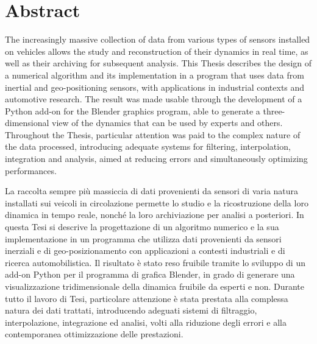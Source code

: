 %
%

\chapter*{Abstract}
\begin{SingleSpace}

The increasingly massive collection of data from various types of sensors installed on vehicles allows the study and reconstruction of their dynamics in real time, as well as their archiving for subsequent analysis.
This Thesis describes the design of a numerical algorithm and its implementation in a program that uses data from inertial and geo-positioning sensors, with applications in industrial contexts and automotive research. The result was made usable through the development of a Python add-on for the Blender graphics program, able to generate a three-dimensional view of the dynamics that can be used by experts and others.
Throughout the Thesis, particular attention was paid to the complex nature of the data processed, introducing adequate systems for filtering, interpolation, integration and analysis, aimed at reducing errors and simultaneously optimizing performances.

\vspace{20mm}

La raccolta sempre più massiccia di dati provenienti da sensori di varia natura installati sui veicoli in circolazione permette lo studio e la ricostruzione della loro dinamica in tempo reale, nonché la loro archiviazione per analisi a posteriori. 
In questa Tesi si descrive la progettazione di un algoritmo numerico e la sua implementazione in un programma che utilizza dati provenienti da sensori inerziali e di geo-posizionamento con applicazioni a contesti industriali e di ricerca automobilistica. Il risultato è stato reso fruibile tramite lo sviluppo di un add-on Python per il programma di grafica Blender, in grado di generare una visualizzazione tridimensionale della dinamica fruibile da esperti e non. 
Durante tutto il lavoro di Tesi, particolare attenzione è stata prestata alla complessa natura dei dati trattati, introducendo adeguati sistemi di filtraggio, interpolazione, integrazione ed analisi, volti alla riduzione degli errori e alla contemporanea ottimizzazione delle prestazioni.

\end{SingleSpace}